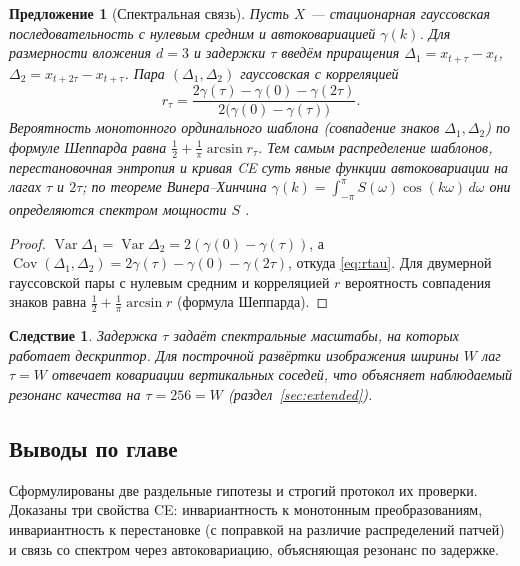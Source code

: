\documentclass[14pt]{extarticle}
\theoremstyle{plain}
\newtheorem{proposition}{Предложение}
\newtheorem{corollary}{Следствие}
\numberwithin{equation}{section}
\numberwithin{figure}{section}
\numberwithin{table}{section}
\begin{document}
\begin{proposition}[Спектральная связь]\label{prop:spec}
Пусть $X$ — стационарная гауссовская последовательность с нулевым средним и
автоковариацией $\gamma(k)$. Для размерности вложения $d=3$ и задержки $\tau$
введём приращения $\Delta_1=x_{t+\tau}-x_t$, $\Delta_2=x_{t+2\tau}-x_{t+\tau}$.
Пара $(\Delta_1,\Delta_2)$ гауссовская с корреляцией
\begin{equation}
r_\tau=\frac{2\gamma(\tau)-\gamma(0)-\gamma(2\tau)}{2\bigl(\gamma(0)-\gamma(\tau)\bigr)} .
\label{eq:rtau}
\end{equation}
Вероятность монотонного ординального шаблона (совпадение знаков $\Delta_1,\Delta_2$)
по формуле Шеппарда равна $\tfrac12+\tfrac1\pi\arcsin r_\tau$. Тем самым
распределение шаблонов, перестановочная энтропия и кривая CE суть явные функции
автоковариации на лагах $\tau$ и $2\tau$; по теореме Винера–Хинчина
$\gamma(k)=\int_{-\pi}^{\pi}S(\omega)\cos(k\omega)\,d\omega$ они определяются
спектром мощности $S$ \citep{bandt2007order}.
\end{proposition}
\begin{proof}
$\operatorname{Var}\Delta_1=\operatorname{Var}\Delta_2=2(\gamma(0)-\gamma(\tau))$,
а $\operatorname{Cov}(\Delta_1,\Delta_2)=2\gamma(\tau)-\gamma(0)-\gamma(2\tau)$,
откуда \eqref{eq:rtau}. Для двумерной гауссовской пары с нулевым средним и
корреляцией $r$ вероятность совпадения знаков равна
$\tfrac12+\tfrac1\pi\arcsin r$ (формула Шеппарда). \qedhere
\end{proof}

\begin{corollary}
Задержка $\tau$ задаёт спектральные масштабы, на которых работает дескриптор. Для
построчной развёртки изображения ширины $W$ лаг $\tau=W$ отвечает ковариации
вертикальных соседей, что объясняет наблюдаемый резонанс качества на $\tau=256=W$
(раздел~\ref{sec:extended}).
\end{corollary}

\subsection*{Выводы по главе}
Сформулированы две раздельные гипотезы и строгий протокол их проверки. Доказаны
три свойства CE: инвариантность к монотонным преобразованиям, инвариантность к
перестановке (с поправкой на различие распределений патчей) и связь со спектром
через автоковариацию, объясняющая резонанс по задержке.
\end{document}
